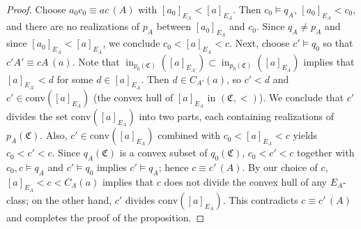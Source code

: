 \documentclass[10pt,a4paper]{amsart}
\DeclareMathOperator{\supin}{in}
\newcommand{\Mon}{\mathfrak C}
\newcommand{\conv}{\mathrm{conv}}
\begin{document}
\begin{proof}
Choose $a_0c_0\equiv ac\,(A)$ with $[a_0]_{E_A}<[a]_{E_A}$. Then $c_0\models q_A$, $[a_0]_{E_A}<c_0$, and there are no realizations of $p_A$ between $[a_0]_{E_A}$ and $c_0$. Since $q_A\neq p_A$ and since $[a_0]_{E_A}<[a]_{E_A}$, we conclude $c_0<[a]_{E_A}<c$. Next, choose $c'\models q_0$ so that $c'A'\equiv cA\,(a)$. 
Note that $\supin_{p_0(\Mon)} ([a]_{E_{A'}})\subset\supin_{p_0(\Mon)} ([a]_{E_A})$ implies that $[a]_{E_{A'}}<d$ for some $d\in [a]_{E_A}$. 
Then $d\in C_{A'}(a)$, so $c'<d$ and $c'\in \conv([a]_{E_A})$ (the convex hull of $[a]_{E_A}$ in $(\Mon,<)$). 
We conclude that $c'$ divides the set $\conv([a]_{E_A})$ into two parts, each containing realizations of $p_A(\Mon)$. Also, $c'\in \conv([a]_{E_A})$ combined with $c_0<[a]_{E_A}<c$ yields $c_0<c'<c$. Since $q_A(\Mon)$ is a convex subset of $q_0(\Mon)$, $c_0<c'<c$ together with $c_0,c\models q_A$ and $c'\models q_0$ implies $c'\models q_A$; hence $c\equiv c'\,(A)$. By our choice of $c$, $[a]_{E_A}<c<C_A(a)$ implies that $c$ does not divide the convex hull of any $E_A$-class; on the other hand, $c'$ divides $\conv([a]_{E_A})$. This contradicts $c\equiv c'\,(A)$ and completes the proof of the proposition. 
\end{proof}
\end{document}
